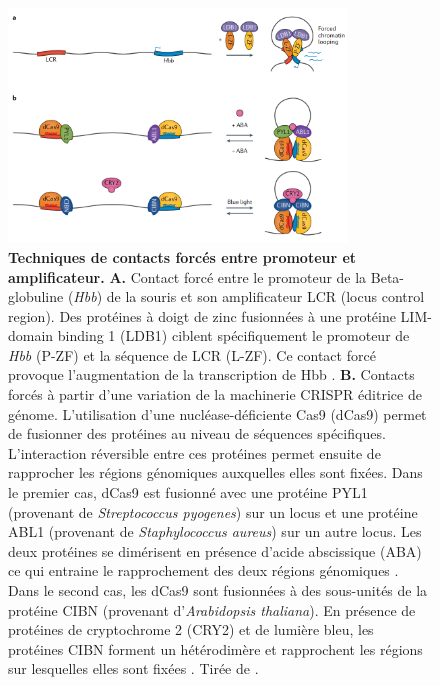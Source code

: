 \begin{figure}[H]
 \centering
 \includegraphics[width=0.8\textwidth, page=1] {figures/introduction/fig12.png}
 \caption[Techniques de contacts forcés entre promoteur et \gls{amplificateur}.]{
 \textbf{Techniques de contacts forcés entre promoteur et \gls{amplificateur}.}
 \textbf{A.} Contact forcé entre le promoteur de la Beta-globuline (\textit{Hbb}) de la souris et son \gls{amplificateur} LCR (locus control region). Des protéines à doigt de zinc fusionnées à une protéine LIM-domain binding 1 (LDB1) ciblent spécifiquement le promoteur de \textit{Hbb} (P-ZF) et la séquence de LCR (L-ZF). Ce contact forcé provoque l'augmentation de la transcription de Hbb \citep{deng_controlling_2012}.
 \textbf{\textbf{B.}} Contacts forcés à partir d'une variation de la machinerie CRISPR éditrice de génome. L'utilisation d'une nucléase-déficiente Cas9 (dCas9) permet de fusionner des protéines au niveau de séquences spécifiques. L'interaction réversible entre ces protéines permet ensuite de rapprocher les régions génomiques auxquelles elles sont fixées. Dans le premier cas, dCas9 est fusionné avec une protéine PYL1 (provenant de \textit{Streptococcus pyogenes}) sur un locus et une protéine ABL1 (provenant de \textit{Staphylococcus aureus}) sur un autre locus. Les deux protéines se dimérisent en présence d'acide abscissique (ABA) ce qui entraine le rapprochement des deux régions génomiques \citep{morgan_manipulation_2017}. Dans le second cas, les dCas9 sont fusionnées à des sous-unités de la protéine CIBN (provenant d'\textit{Arabidopsis thaliana}). En présence de protéines de cryptochrome 2 (CRY2) et de lumière bleu, les protéines CIBN forment un hétérodimère et rapprochent les régions sur lesquelles elles sont fixées \citep{kim_ladl_2019}. Tirée de \citet{schoenfelder_long-range_2019}.\\
 }
 \label{fig:Fig12}
\end{figure}

